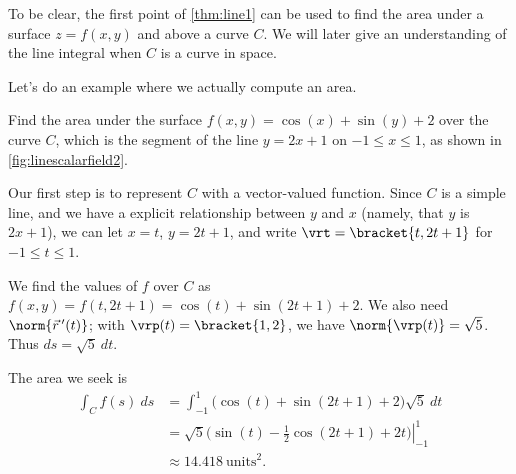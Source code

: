 To be clear, the first point of \autoref{thm:line1} can be used to find the area under a surface $z=f(x,y)$ and above a curve $C$. We will later give an understanding of the line integral when $C$ is a curve in space.


Let's do an example where we actually compute an area.


{Find the area under the surface $f(x,y) =\cos(x)+\sin(y)+2$ over the curve $C$, which is the segment of the line $y=2x+1$ on $-1\leq x\leq 1$, as shown in \autoref{fig:linescalarfield2}.}
{Our first step is to represent $C$ with a vector-valued function. Since $C$ is a simple line, and we have a explicit relationship between $y$ and $x$ (namely, that $y$ is $2x+1$), we can let $x = t$, $y = 2t+1$, and write $\vrt =\bracket{t,2t+1}$ for $-1\leq t\leq 1$. 

We find the values of $f$ over $C$ as $f(x,y) = f(t,2t+1) = \cos(t)+\sin(2t+1) + 2$. We also need $\norm{\vec r\,'(t)}$; with $\vrp(t) =\bracket{1,2}$, we have $\norm{\vrp(t)} = \sqrt{5}$. Thus $ds = \sqrt{5}\ dt$. 

The area we seek is 
\begin{align*}
	\int_Cf(s)\ ds
	&= \int_{-1}^1 \big(\cos(t)+\sin(2t+1) + 2\big)\sqrt{5}\ dt \\
	&= \left.\sqrt{5}\big(\sin(t) - \frac12\cos(2t+1)+2t\big)\right|_{-1}^1\\
	&\approx 14.418\ \text{units}^2.
\end{align*}}

